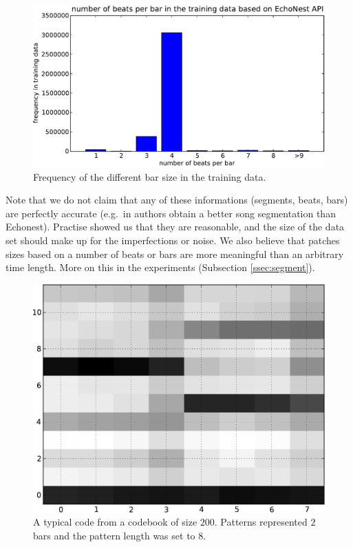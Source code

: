 \documentclass{article}
\newcommand{\eg}{e.g.~}
\begin{document}
\begin{figure}[htb]
\begin{center}
\includegraphics[width=.9\columnwidth]{bar_size_freq}
\end{center}
\caption{\small{
Frequency of the different bar size in the training data.
}}
\label{fig:barsize}
\end{figure}

Note that we do not claim that any of these informations (segments, beats, bars)
are perfectly accurate (\eg in \cite{Barrington2009a} authors obtain a better
song segmentation than Echonest). Practise showed us that they are reasonable, 
and the size of the data set should make up for the imperfections or noise.
We also believe that patches sizes based on a number of beats or bars are more
meaningful than an arbitrary time length. More on this in the experiments
(Subsection \ref{ssec:segment}).

\begin{figure}[htb]
\begin{center}
\includegraphics[width=.6\columnwidth]{code}
\end{center}
\caption{\small{A typical code from a codebook of size $200$. 
Patterns represented
$2$ bars and the pattern length was set to $8$.
}}
\label{fig:code}
\end{figure}
\end{document}

